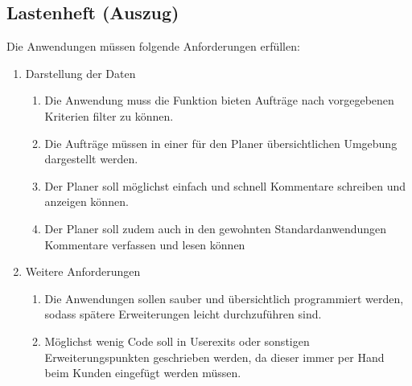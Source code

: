 \subsection{Lastenheft (Auszug)}
\label{app:Lastenheft}

Die Anwendungen müssen folgende Anforderungen erfüllen: 
\begin{enumerate}[itemsep=0em,partopsep=0em,parsep=0em,topsep=0em]
\item Darstellung der Daten
	\begin{enumerate}
	\item Die Anwendung muss die Funktion bieten Aufträge nach vorgegebenen Kriterien filter zu können.
	\item Die Aufträge müssen in einer für den Planer übersichtlichen Umgebung dargestellt werden.
	\item Der Planer soll möglichst einfach und schnell Kommentare schreiben und anzeigen können. 
	\item Der Planer soll zudem auch in den gewohnten Standardanwendungen Kommentare verfassen und lesen können 
	\end{enumerate}
\item Weitere Anforderungen
	\begin{enumerate}
	\item Die Anwendungen sollen sauber und übersichtlich programmiert werden, sodass spätere Erweiterungen leicht durchzuführen sind.
	\item Möglichst wenig Code soll in Userexits oder sonstigen Erweiterungspunkten geschrieben werden, da dieser immer per Hand beim Kunden eingefügt werden müssen.
	\end{enumerate}
\end{enumerate}

